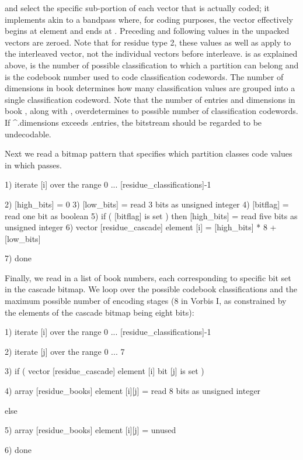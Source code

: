  and
 select the specific sub-portion of
each vector that is actually coded; it implements akin to a bandpass
where, for coding purposes, the vector effectively begins at element
 and ends at
.  Preceding and following values in
the unpacked vectors are zeroed.  Note that for residue type 2, these
values as well as apply to
the interleaved vector, not the individual vectors before interleave.
 is as explained above,
 is the number of possible
classification to which a partition can belong and
 is the codebook number used to
code classification codewords.  The number of dimensions in book
 determines how many
classification values are grouped into a single classification
codeword.  Note that the number of entries and dimensions in book
, along with
, overdetermines to
possible number of classification codewords.  
If \^{}.dimensions
exceeds .entries, the
bitstream should be regarded to be undecodable.

Next we read a bitmap pattern that specifies which partition classes
code values in which passes.

\begin{programlisting}
  1) iterate [i] over the range 0 ... [residue\_classifications]-1 {

       2) [high\_bits] = 0
       3) [low\_bits] = read 3 bits as unsigned integer
       4) [bitflag] = read one bit as boolean
       5) if ( [bitflag] is set ) then [high\_bits] = read five bits as unsigned integer
       6) vector [residue\_cascade] element [i] = [high\_bits] * 8 + [low\_bits]
     }
  7) done
\end{programlisting}

Finally, we read in a list of book numbers, each corresponding to
specific bit set in the cascade bitmap.  We loop over the possible
codebook classifications and the maximum possible number of encoding
stages (8 in Vorbis I, as constrained by the elements of the cascade
bitmap being eight bits):

\begin{programlisting}
  1) iterate [i] over the range 0 ... [residue\_classifications]-1 {

       2) iterate [j] over the range 0 ... 7 {

            3) if ( vector [residue\_cascade] element [i] bit [j] is set ) {

                 4) array [residue\_books] element [i][j] = read 8 bits as unsigned integer

               } else {

                 5) array [residue\_books] element [i][j] = unused

               }
          }
      }

  6) done
\end{programlisting}

